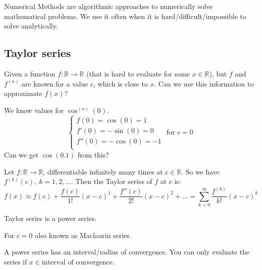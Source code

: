 
\begin{definition}
    Numerical Methods are algorithmic approaches to numerically solve mathematical problems.
    We use it often when it is hard/difficult/impossible to solve analytically.
\end{definition}

\subsection{Taylor series}
Given a function $f : \mathbb{R} \to \mathbb{R}$
(that is hard to evaluate for some $x \in \mathbb{R}$),
but $f$ and $f^{(n)}$ are known for a value $c$, which is close to $x$.
Can we use this information to approximate $f(x)$?

We know values for $\cos^{(n)}(0)$.
\[
    \begin{cases}
        f(0) = \cos(0) = 1\\
        f'(0) = -\sin(0) = 0\\
        f''(0) = -\cos(0) = -1\\
    \end{cases} \text{ for } c = 0
\]
Can we get $\cos(0.1)$ from this?

\begin{definition}
    Let $f : \mathbb{R} \to \mathbb{R}$, differentiable 
    infinitely many times at $c \in \mathbb{R}$.
    So we have $f^{(k)}(c),\ k=1,2,\dots $. Then the Taylor series of $f$ at $c$ is:
    \[
        f(x) \approx f(c) + \frac{f(c)}{1!}(x-c)^1 + \frac{f''(c)}{2!}(x-c)^2 + \dots =
        \sum_{k=0}^{\infty} \frac{f^{(k)}}{k!} (x - c)^k
    \]
\end{definition}

\begin{remark}
    Taylor series is a power series.
\end{remark}

\begin{remark}
    For $c = 0$ also known as Maclaurin series
\end{remark}

\begin{remark}
    A power series has an interval/radius of convergence.
    You can only evaluate the series if $x \in \text{interval of convergence}$.
\end{remark}

